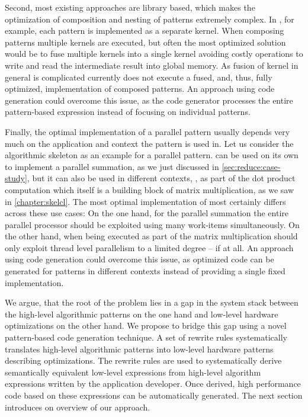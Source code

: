 Second, most existing approaches are library based, which makes the optimization of composition and nesting of patterns extremely complex.
In \SkelCL, for example, each pattern is implemented as a separate \OpenCL kernel.
When composing patterns multiple \OpenCL kernels are executed, but often the most optimized solution would be to fuse multiple \OpenCL kernels into a single \OpenCL kernel avoiding costly operations to write and read the intermediate result into global memory.
As fusion of \OpenCL kernel in general is complicated \SkelCL currently does not execute a fused, and, thus, fully optimized, implementation of composed patterns.
An approach using code generation could overcome this issue, as the code generator processes the entire pattern-based expression instead of focusing on individual patterns.

Finally, the optimal implementation of a parallel pattern usually depends very much on the application and context the pattern is used in.
Let us consider the algorithmic skeleton \reduce as an example for a parallel pattern.
\reduce can be used on its own to implement a parallel summation, as we just discussed in \autoref{sec:reduce:case-study}, but it can also be used in different contexts, \eg, as part of the dot product computation which itself is a building block of matrix multiplication, as we saw in \autoref{chapter:skelcl}.
The most optimal implementation of \reduce most certainly differs across these use cases:
On the one hand, for the parallel summation the entire parallel processor should be exploited using many \OpenCL work-items simultaneously.
On the other hand, when being executed as part of the matrix multiplication \reduce should only exploit thread level parallelism to a limited degree -- if at all.
An approach using code generation could overcome this issue, as optimized code can be generated for patterns in different contexts instead of providing a single fixed implementation.

\bigskip

We argue, that the root of the problem lies in a gap in the system stack between the high-level algorithmic patterns on the one hand and low-level hardware optimizations on the other hand.
We propose to bridge this gap using a novel pattern-based code generation technique.
A set of rewrite rules systematically translates high-level algorithmic patterns into low-level hardware patterns describing optimizations.
The rewrite rules are used to systematically derive semantically equivalent low-level expressions from high-level algorithm expressions written by the application developer.
Once derived, high performance code based on these expressions can be automatically generated.
The next section introduces on overview of our approach.
 
